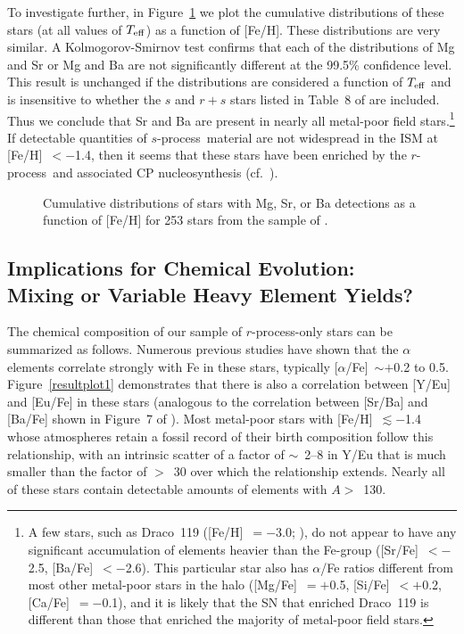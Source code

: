 \documentclass{emulateapj}
\def\rpro{\mbox{$r$-process}}
\def\spro{\mbox{$s$-process}}
\begin{document}
To investigate further,
in Figure~\ref{barkplot} we plot the cumulative distributions
of these stars (at all values of $T_{\rm eff}$) as a function of [Fe/H].
These distributions are very similar.
A Kolmogorov-Smirnov test confirms that each of the distributions 
of Mg and Sr or Mg and Ba are not significantly different
at the 99.5\% confidence level.
This result is unchanged if the distributions are considered
a function of $T_{\rm eff}$ and is insensitive to 
whether the $s$ and $r+s$ stars
listed in Table~8 of \citet{jonsell06} are included.
Thus we conclude that Sr and Ba are 
present in nearly all metal-poor field stars.\footnote{
A few stars, such as Draco~119 ([Fe/H]~$= -$3.0; \citealt{fulbright04}), 
do not appear to have any significant accumulation 
of elements heavier than the Fe-group
([Sr/Fe]~$< -$2.5, [Ba/Fe]~$< -$2.6).
This particular star also has $\alpha$/Fe ratios different
from most other metal-poor stars in the halo
([Mg/Fe]~$= +$0.5, [Si/Fe]~$< +$0.2, [Ca/Fe]~$= -$0.1), 
and it is likely that the SN that enriched Draco~119 is 
different than those that enriched the majority of metal-poor field stars.}
If detectable quantities of \spro\ material 
are not widespread in the ISM 
at [Fe/H]~$< -$1.4, then it seems that these stars have been
enriched by the \rpro\ and associated
CP nucleosynthesis (cf.\ \citealt{truran81}).

\begin{figure}
\caption{
\label{barkplot}
Cumulative distributions of stars with Mg, Sr, or Ba detections
as a function of [Fe/H] for 253 stars from the sample of \citet{barklem05}.
}
\end{figure}


\subsection{Implications for Chemical Evolution: \\
Mixing or Variable Heavy Element Yields?}


The chemical composition of our sample of \rpro-only stars
can be summarized as follows.
Numerous previous studies have shown that 
the $\alpha$ elements correlate strongly with Fe in these stars, 
typically [$\alpha$/Fe]~$\sim +$0.2 to 0.5. 
Figure~\ref{resultplot1} demonstrates that there is also a 
correlation between [Y/Eu] and [Eu/Fe] in these stars
(analogous to the correlation between [Sr/Ba] and [Ba/Fe]
shown in Figure~7 of \citealt{sneden08}).
Most metal-poor stars with [Fe/H]~$\lesssim -$1.4
whose atmospheres retain a fossil record of their birth composition
follow this relationship, with an intrinsic
scatter of a factor of $\sim$~2--8 in Y/Eu that is much
smaller than the factor of $>$~30 over which the relationship extends.
Nearly all of these stars
contain detectable amounts of elements with $A >$~130.
\end{document}
